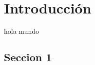 \chapter{Introducción}
\label{cap:capitulo1}
\setcounter{page}{1}

hola mundo

\section{Seccion 1}
\label{sec:miseccion}
